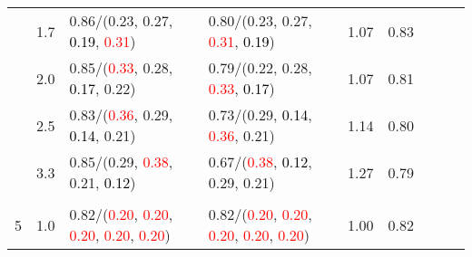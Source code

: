 \documentclass[10pt,a4paper]{report}
\begin{document}
\begin{table}[!htbp]
\begin{center}
{\begin{tabular}{ccllccccc}
				  & 1.7                               & 0.86/(0.23, 0.27, \textcolor{black}{0.19}, \textcolor{red}{0.31})                                                                                                                             & 0.80/(0.23, 0.27, \textcolor{red}{0.31}, \textcolor{black}{0.19})                                                                                                                             & 1.07             & 0.83                     \\
				  & 2.0                               & 0.85/(\textcolor{red}{0.33}, 0.28, \textcolor{black}{0.17}, 0.22)                                                                                                                             & 0.79/(0.22, 0.28, \textcolor{red}{0.33}, \textcolor{black}{0.17})                                                                                                                             & 1.07             & 0.81                     \\
				  & 2.5                               & 0.83/(\textcolor{red}{0.36}, 0.29, \textcolor{black}{0.14}, 0.21)                                                                                                                             & 0.73/(0.29, \textcolor{black}{0.14}, \textcolor{red}{0.36}, 0.21)                                                                                                                             & 1.14             & 0.80                     \\
				  & 3.3                               & 0.85/(0.29, \textcolor{red}{0.38}, 0.21, \textcolor{black}{0.12})                                                                                                                             & 0.67/(\textcolor{red}{0.38}, \textcolor{black}{0.12}, 0.29, 0.21)                                                                                                                             & 1.27             & 0.79                     \\
				  &                                   &                                                                                                                                                                                               &                                                                                                                                                                                               &                                             \\
				5 & 1.0                               & 0.82/(\textcolor{red}{0.20}, \textcolor{red}{0.20}, \textcolor{red}{0.20}, \textcolor{red}{0.20}, \textcolor{red}{0.20})                                                                      & 0.82/(\textcolor{red}{0.20}, \textcolor{red}{0.20}, \textcolor{red}{0.20}, \textcolor{red}{0.20}, \textcolor{red}{0.20})                                                                      & 1.00             & 0.82                     \\

\end{tabular}}
\end{center}
\end{table}
\end{document}
